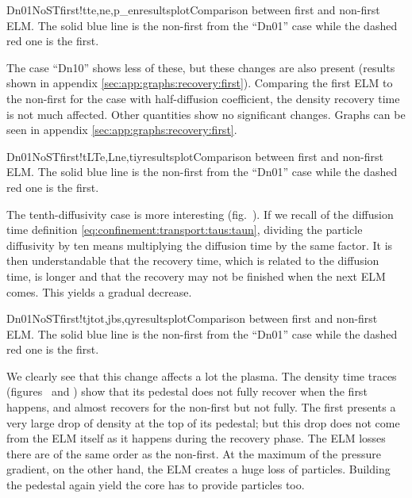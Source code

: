 \begin{AllFigs}{Dn01NoSTfirst}{!t}{}{te,ne,p_e}{n}{resultsplot}{Comparison between first and non-first ELM. The solid blue line is the non-first from the ``Dn01'' case while the dashed red one is the first.}
\end{AllFigs}
The case ``Dn10'' shows less of these, but these changes are also present (results shown in appendix \ref{sec:app:graphs:recovery:first}). Comparing the first ELM to the non-first for the case with half-diffusion coefficient, the density recovery time is not much affected. Other quantities show no significant changes. Graphs can be seen in appendix \ref{sec:app:graphs:recovery:first}.

\begin{AllFigs}{Dn01NoSTfirst}{!t}{}{LTe,Lne,ti}{y}{resultsplot}{Comparison between first and non-first ELM. The solid blue line is the non-first from the ``Dn01'' case while the dashed red one is the first.}
\end{AllFigs}
The tenth-diffusivity case is more interesting (fig.~). If we recall of the diffusion time definition \eqref{eq:confinement:transport:taus:taun}, dividing the particle diffusivity by ten means multiplying the diffusion time by the same factor. It is then understandable that the recovery time, which is related to the diffusion time, is longer and that the recovery may not be finished when the next ELM comes. This yields a gradual decrease.

\begin{AllFigs}{Dn01NoSTfirst}{!t}{}{jtot,jbs,q}{y}{resultsplot}{Comparison between first and non-first ELM. The solid blue line is the non-first from the ``Dn01'' case while the dashed red one is the first.}
\end{AllFigs}
We clearly see that this change affects a lot the plasma. The density time traces (figures~ and ) show that its pedestal does not fully recover when the first happens, and almost recovers for the non-first but not fully. The first presents a very large drop of density at the top of its pedestal; but this drop does not come from the ELM itself as it happens during the recovery phase. The ELM losses there are of the same order as the non-first. At the maximum of the pressure gradient, on the other hand, the ELM creates a huge loss of particles. Building the pedestal again yield the core has to provide particles too.

